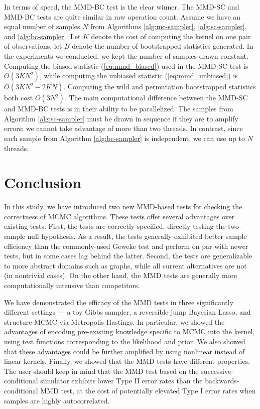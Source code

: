 \documentclass[a4paper,11pt]{article}
\begin{document}
In terms of speed, the MMD-BC test is the clear winner. The MMD-SC and MMD-BC tests are quite similar in raw operation count. Assume we have an equal number of samples $N$ from Algorithms \ref{alg:mc-sampler}, \ref{alg:sc-sampler}, and \ref{alg:bc-sampler}. Let $K$ denote the cost of computing the kernel on one pair of observations, let $B$ denote the number of bootstrapped statistics generated. In the experiments we conducted, we kept the number of samples drawn constant. Computing the biased statistic (\ref{eq:mmd_biased}) used in the MMD-SC test is $O(3KN^{2})$, while computing the unbiased statistic (\ref{eq:mmd_unbiased}) is $O(3KN^{2}-2KN)$. Computing the wild and permutation bootstrapped statistics both cost $O(3N^{2})$. The main computational difference between the MMD-SC and MMD-BC tests is in their ability to be parallelized. The samples from Algorithm \ref{alg:sc-sampler} must be drawn in sequence if they are to amplify errors; we cannot take advantage of more than two threads. In contrast, since each sample from Algorithm \ref{alg:bc-sampler} is independent, we can use up to $N$ threads.

\section{Conclusion}

In this study, we have introduced two new MMD-based tests for checking the correctness of MCMC algorithms. These tests offer several advantages over existing tests. First, the tests are correctly specified, directly testing the two-sample null hypothesis. As a result, the tests generally exhibited better sample efficiency than the commonly-used Geweke test and perform on par with newer tests, but in some cases lag behind the latter. Second, the tests are generalizable to more abstract domains such as graphs, while all current alternatives are not (in nontrivial cases). On the other hand, the MMD tests are generally more computationally intensive than competitors.

We have demonstrated the efficacy of the MMD tests in three significantly different settings --- a toy Gibbs sampler, a reversible-jump Bayesian Lasso, and structure-MCMC via Metropolis-Hastings. In particular, we showed the advantages of encoding pre-existing knowledge specific to MCMC into the kernel, using test functions corresponding to the likelihood and prior. We also showed that these advantages could be further amplified by using nonlinear instead of linear kernels. Finally, we showed that the MMD tests have different properties. The user should keep in mind that the MMD test based on the successive-conditional simulator exhibits lower Type II error rates than the backwards-conditional MMD test, at the cost of potentially elevated Type I error rates when samples are highly autocorrelated.
\end{document}
